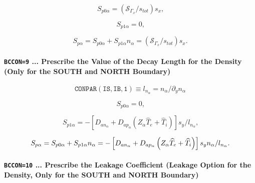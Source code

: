 \documentclass[11pt]{article}
\begin{document}
\begin{equation}
S_{p0\alpha}=\left( \mathcal{S}_{\Gamma_{x}}/s_{tot}\right) s_{x}\text{,} 
\label{c54}
\end{equation}

\begin{equation}
S_{p1\alpha}=0\text{,}   \label{c55}
\end{equation}

\begin{equation}
S_{p\alpha}=S_{p0\alpha}+S_{p1\alpha}n_{\alpha}=\left( \mathcal{S}%
_{\Gamma_{x}}/s_{tot}\right) s_{x}\text{.}   \label{c56}
\end{equation}

\bigskip

\paragraph{\texttt{BCCON=9} ... Prescribe the Value of the Decay Length for
the Density (Only for the SOUTH and NORTH Boundary)}

\bigskip

\begin{equation*}
\mathtt{CONPAR(IS,IB,1)}\equiv
l_{n_{\alpha}}=n_{\alpha}/\partial_{y}n_{\alpha}
\end{equation*}

\bigskip

\begin{equation}
S_{p0\alpha}=0\text{,}   \label{c57}
\end{equation}

\begin{equation}
S_{p1\alpha}=-\left[ D_{an_{\alpha}}+D_{ap_{\alpha}}\left( Z_{\alpha }%
\widehat{T}_{e}+\widehat{T}_{i}\right) \right] s_{y}/l_{n_{\alpha}}\text{,} 
\label{c58}
\end{equation}

\begin{equation}
S_{p\alpha}=S_{p0\alpha}+S_{p1\alpha}n_{\alpha}=-\left[ D_{an_{%
\alpha}}+D_{ap_{\alpha}}\left( Z_{\alpha}\widehat{T}_{e}+\widehat{T}%
_{i}\right) \right] s_{y}n_{\alpha}/l_{n_{\alpha}}\text{.}   \label{c59}
\end{equation}

\bigskip

\paragraph{\texttt{BCCON=10} ... Prescribe the Leakage Coefficient (Leakage
Option for the Density, Only for the SOUTH and NORTH Boundary)}
\end{document}
